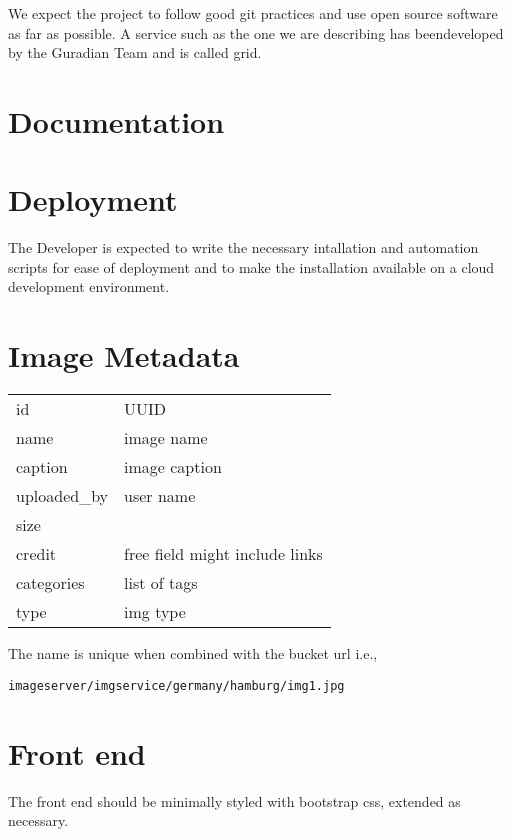 We expect the project to follow good git practices and use open source software as far as possible.
A service such as the one we are describing has beendeveloped by the Guradian Team and is called 
grid.

\section{Documentation}

\section{Deployment}

The Developer is expected to write the necessary intallation and automation scripts for ease of deployment and to make the installation available on a cloud development environment.


\section{Image Metadata}

\begin{tabular}{ll}
id          & UUID          \\
name        & image name    \\
caption     & image caption \\
uploaded\_by & user name     \\
size        &               \\
credit      & free field might include links  \\
categories  & list of tags \\
type        & img type     \\  
\end{tabular}

The name is unique when combined with the bucket url i.e.,

\texttt{imageserver/imgservice/germany/hamburg/img1.jpg}

\section{Front end}

The front end should be minimally styled with bootstrap css, extended as necessary.























